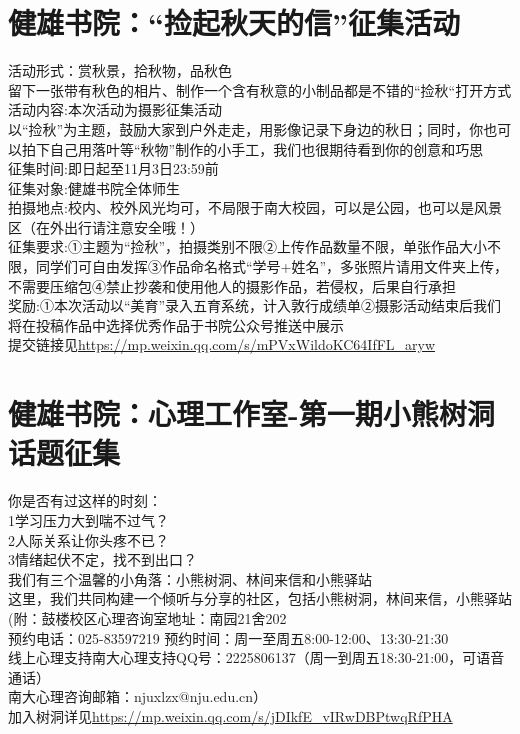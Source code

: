 \documentclass[letterpaper, 12pt]{article}
\begin{document}
\begin{multicols}{2}
\section{健雄书院：“捡起秋天的信”征集活动}
活动形式：赏秋景，拾秋物，品秋色\\
留下一张带有秋色的相片、制作一个含有秋意的小制品都是不错的“捡秋“打开方式\\
活动内容:本次活动为摄影征集活动\\
以“捡秋”为主题，鼓励大家到户外走走，用影像记录下身边的秋日；同时，你也可以拍下自己用落叶等“秋物”制作的小手工，我们也很期待看到你的创意和巧思\\
征集时间:即日起至11月3日23:59前\\
征集对象:健雄书院全体师生\\
拍摄地点:校内、校外风光均可，不局限于南大校园，可以是公园，也可以是风景区（在外出行请注意安全哦！）\\
征集要求:①主题为“捡秋”，拍摄类别不限②上传作品数量不限，单张作品大小不限，同学们可自由发挥③作品命名格式“学号+姓名”，多张照片请用文件夹上传，不需要压缩包④禁止抄袭和使用他人的摄影作品，若侵权，后果自行承担\\
奖励:①本次活动以“美育”录入五育系统，计入敦行成绩单②摄影活动结束后我们将在投稿作品中选择优秀作品于书院公众号推送中展示\\
提交链接见\url{https://mp.weixin.qq.com/s/mPVxWildoKC64IfFL_aryw}

\section{健雄书院：心理工作室-第一期小熊树洞话题征集}
你是否有过这样的时刻：\\
1学习压力大到喘不过气？\\
2人际关系让你头疼不已？\\
3情绪起伏不定，找不到出口？\\
我们有三个温馨的小角落：小熊树洞、林间来信和小熊驿站\\
这里，我们共同构建一个倾听与分享的社区，包括小熊树洞，林间来信，小熊驿站\\

(附：鼓楼校区心理咨询室地址：南园21舍202\\
预约电话：025-83597219
预约时间：周一至周五8:00-12:00、13:30-21:30\\
线上心理支持南大心理支持QQ号：2225806137（周一到周五18:30-21:00，可语音通话）\\
南大心理咨询邮箱：njuxlzx@nju.edu.cn）\\
加入树洞详见\url{https://mp.weixin.qq.com/s/jDIkfE_vIRwDBPtwqRfPHA}

\end{multicols} 
\end{document}
